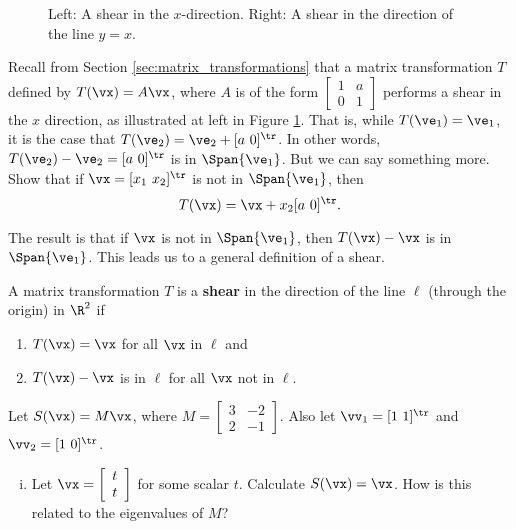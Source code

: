 \begin{figure}[ht]
\begin{center}
 \hspace{0.5in} 
\end{center}
\caption{Left: A shear in the $x$-direction. Right: A shear in the direction of the line $y=x$.}
\label{F:JCF_shear_1}
\end{figure}

\begin{activity} \label{act:JCF_shears} 
Recall from Section \ref{sec:matrix_transformations} that a matrix transformation $T$ defined by $T(\vx) = A\vx$, where $A$ is of the form $\left[ \begin{array}{cc} 1&a\\0&1 \end{array} \right]$ performs a shear in the $x$ direction, as illustrated at left in Figure \ref{F:JCF_shear_1}. That is, while $T(\ve_1) = \ve_1$, it is the case that $T(\ve_2) = \ve_2 + [a \ 0]^{\tr}$. In other words, $T(\ve_2)-\ve_2 = [a \ 0]^{\tr}$ is in $\Span \{\ve_1\}$. But we can say something more. Show that if 
$\vx = [x_1 \ x_2]^{\tr}$ is not in $\Span \{\ve_1\}$, then 
\[T(\vx) = \vx + x_2[a \ 0]^{\tr}.\]

The result is that if $\vx$ is not in $\Span \{\ve_1\}$, then $T(\vx) - \vx$ is in $\Span \{\ve_1\}$. This leads us to a general definition of a shear.

\begin{definition} A matrix transformation $T$ is a \textbf{shear} in the direction of the line $\ell$ (through the origin) in $\R^2$ if
\begin{enumerate}
\item $T(\vx) = \vx$ for all $\vx$ in $\ell$ and 
\item $T(\vx) - \vx$ is in $\ell$ for all $\vx$ not in $\ell$.
\end{enumerate}
\end{definition}

\ba
\item Let $S(\vx) = M\vx$, where $M = \left[ \begin{array}{cr} 3&-2\\2&-1 \end{array} \right]$. Also let $\vv_1 = [1 \ 1]^{\tr}$ and $\vv_2 = [1 \ 0]^{\tr}$. 
	\begin{enumerate}[i.]
	\item Let $\vx = \left[ \begin{array}{c} t\\t \end{array} \right]$ for some scalar $t$. Calculate $S(\vx) = \vx$. How is this related to the eigenvalues of $M$?
	

\end{enumerate}
\end{activity}
